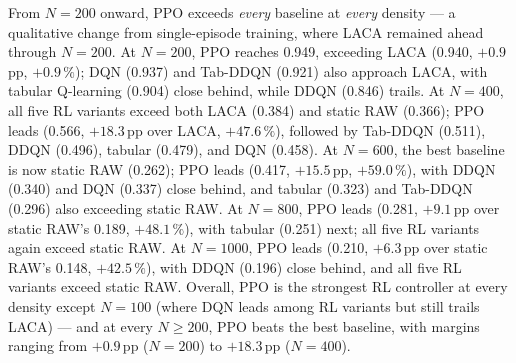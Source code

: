 \documentclass[conference]{IEEEtran}
\begin{document}
From $N = 200$ onward, PPO exceeds \emph{every} baseline at \emph{every}
density — a qualitative change from single-episode training, where LACA
remained ahead through $N=200$.
At $N = 200$, PPO reaches 0.949, exceeding LACA (0.940, $+0.9$\,pp,
$+0.9\,\%$); DQN (0.937) and Tab-DDQN (0.921) also approach LACA, with
tabular Q-learning (0.904) close behind, while DDQN (0.846) trails.
At $N = 400$, all five RL variants exceed both LACA (0.384) and static RAW
(0.366); PPO leads (0.566, $+18.3$\,pp over LACA, $+47.6\,\%$), followed by
Tab-DDQN (0.511), DDQN (0.496), tabular (0.479), and DQN (0.458).
At $N = 600$, the best baseline is now static RAW (0.262); PPO leads
(0.417, $+15.5$\,pp, $+59.0\,\%$), with DDQN (0.340) and DQN (0.337)
close behind, and tabular (0.323) and Tab-DDQN (0.296) also exceeding static
RAW.
At $N = 800$, PPO leads (0.281, $+9.1$\,pp over static RAW's 0.189,
$+48.1\,\%$), with tabular (0.251) next; all five RL
variants again exceed static RAW.
At $N = 1000$, PPO leads (0.210, $+6.3$\,pp over static RAW's 0.148,
$+42.5\,\%$), with DDQN (0.196) close behind, and all
five RL variants exceed static RAW.
Overall, PPO is the strongest RL controller at every density except
$N=100$ (where DQN leads among RL variants but still trails LACA) — and at
every $N \geq 200$, PPO beats the best baseline, with margins ranging from
$+0.9$\,pp ($N=200$) to $+18.3$\,pp ($N=400$).
\end{document}
